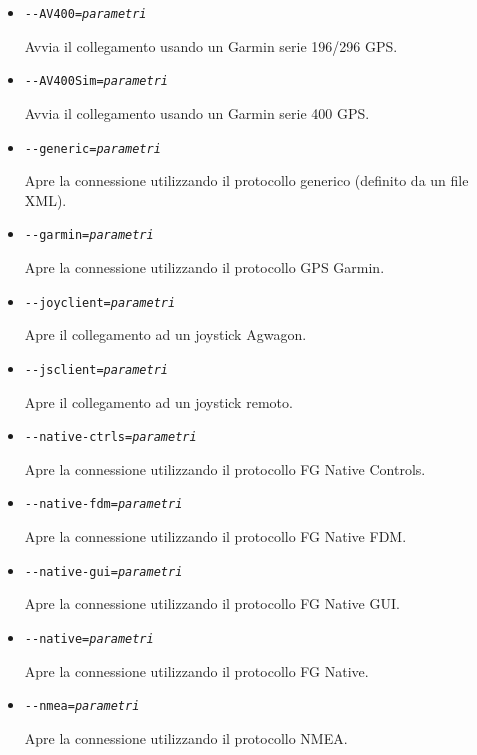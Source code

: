 \begin{itemize}
{\begin{itemize}
    Apre la connessione utilizzando il protocollo ATC Sim (atc610x).

  \item{\texttt{-$ $-AV400={\it parametri}}}

    Avvia il collegamento usando un Garmin  serie 196/296 GPS.

  \item{\texttt{-$ $-AV400Sim={\it parametri}}}

    Avvia il collegamento usando un Garmin serie 400 GPS.

  \item{\texttt{-$ $-generic={\it parametri}}}

    Apre la connessione utilizzando il protocollo generico (definito da un file XML).

  \item{\texttt{-$ $-garmin={\it parametri}}}

    Apre la connessione utilizzando il protocollo GPS Garmin.

  \item{\texttt{-$ $-joyclient={\it parametri}}}

    Apre il collegamento ad un joystick Agwagon.

  \item{\texttt{-$ $-jsclient={\it parametri}}}

    Apre il collegamento ad un joystick remoto.

  \item{\texttt{-$ $-native-ctrls={\it parametri}}}

    Apre la connessione utilizzando il protocollo FG Native Controls.

  \item{\texttt{-$ $-native-fdm={\it parametri}}}

    Apre la connessione utilizzando il protocollo FG Native FDM.

  \item{\texttt{-$ $-native-gui={\it parametri}}}

    Apre la connessione utilizzando il protocollo FG Native GUI.

  \item{\texttt{-$ $-native={\it parametri}}}

    Apre la connessione utilizzando il protocollo FG Native.

  \item{\texttt{-$ $-nmea={\it parametri}}}

    Apre la connessione utilizzando il protocollo NMEA.


\end{itemize}}
\end{itemize}
